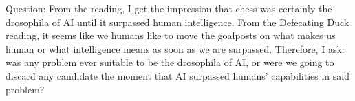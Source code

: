 Question:
From the reading, I get the impression that chess was certainly the drosophila of AI until it surpassed human intelligence.
From the Defecating Duck reading, it seems like we humans like to move the goalposts on what makes us human or what intelligence means as soon as we are surpassed.
Therefore, I ask:
was any problem ever suitable to be the drosophila of AI, or were we going to discard any candidate the moment that AI surpassed humans' capabilities in said problem?
